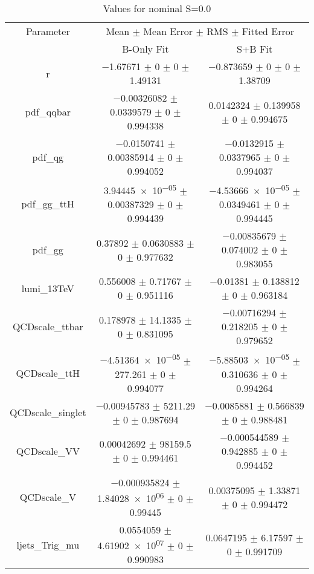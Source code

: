 \begin{table}
\centering
\caption{Values for nominal S=0.0}
\begin{tabular}{ccc}
\toprule
Parameter & \multicolumn{2}{c}{Mean $\pm$ Mean Error $\pm$ RMS $\pm$ Fitted Error}\\
 & B-Only Fit & S+B Fit\\
\midrule
r & \num{-1.67671} $\pm$ \num{0} $\pm$ \num{0} $\pm$ \num{1.49131} & \num{-0.873659} $\pm$ \num{0} $\pm$ \num{0} $\pm$ \num{1.38709}\\
pdf\_qqbar & \num{-0.00326082} $\pm$ \num{0.0339579} $\pm$ \num{0} $\pm$ \num{0.994338} & \num{0.0142324} $\pm$ \num{0.139958} $\pm$ \num{0} $\pm$ \num{0.994675}\\
pdf\_qg & \num{-0.0150741} $\pm$ \num{0.00385914} $\pm$ \num{0} $\pm$ \num{0.994052} & \num{-0.0132915} $\pm$ \num{0.0337965} $\pm$ \num{0} $\pm$ \num{0.994037}\\
pdf\_gg\_ttH & \num{3.94445e-05} $\pm$ \num{0.00387329} $\pm$ \num{0} $\pm$ \num{0.994439} & \num{-4.53666e-05} $\pm$ \num{0.0349461} $\pm$ \num{0} $\pm$ \num{0.994445}\\
pdf\_gg & \num{0.37892} $\pm$ \num{0.0630883} $\pm$ \num{0} $\pm$ \num{0.977632} & \num{-0.00835679} $\pm$ \num{0.074002} $\pm$ \num{0} $\pm$ \num{0.983055}\\
lumi\_13TeV & \num{0.556008} $\pm$ \num{0.71767} $\pm$ \num{0} $\pm$ \num{0.951116} & \num{-0.01381} $\pm$ \num{0.138812} $\pm$ \num{0} $\pm$ \num{0.963184}\\
QCDscale\_ttbar & \num{0.178978} $\pm$ \num{14.1335} $\pm$ \num{0} $\pm$ \num{0.831095} & \num{-0.00716294} $\pm$ \num{0.218205} $\pm$ \num{0} $\pm$ \num{0.979652}\\
QCDscale\_ttH & \num{-4.51364e-05} $\pm$ \num{277.261} $\pm$ \num{0} $\pm$ \num{0.994077} & \num{-5.88503e-05} $\pm$ \num{0.310636} $\pm$ \num{0} $\pm$ \num{0.994264}\\
QCDscale\_singlet & \num{-0.00945783} $\pm$ \num{5211.29} $\pm$ \num{0} $\pm$ \num{0.987694} & \num{-0.0085881} $\pm$ \num{0.566839} $\pm$ \num{0} $\pm$ \num{0.988481}\\
QCDscale\_VV & \num{0.00042692} $\pm$ \num{98159.5} $\pm$ \num{0} $\pm$ \num{0.994461} & \num{-0.000544589} $\pm$ \num{0.942885} $\pm$ \num{0} $\pm$ \num{0.994452}\\
QCDscale\_V & \num{-0.000935824} $\pm$ \num{1.84028e+06} $\pm$ \num{0} $\pm$ \num{0.99445} & \num{0.00375095} $\pm$ \num{1.33871} $\pm$ \num{0} $\pm$ \num{0.994472}\\
ljets\_Trig\_mu & \num{0.0554059} $\pm$ \num{4.61902e+07} $\pm$ \num{0} $\pm$ \num{0.990983} & \num{0.0647195} $\pm$ \num{6.17597} $\pm$ \num{0} $\pm$ \num{0.991709}\\

\end{tabular}
\end{table}
